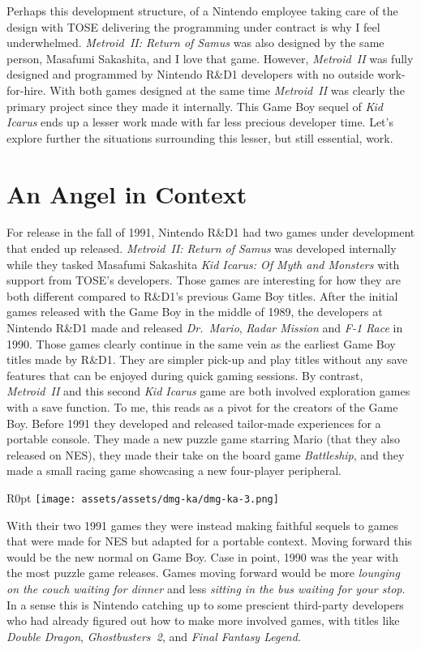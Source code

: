 \documentclass{book}
\begin{document}
Perhaps this development structure, of a Nintendo employee taking care of the design with TOSE delivering the programming under contract is why I feel underwhelmed. \emph{Metroid II: Return of Samus} was also designed by the same person, Masafumi Sakashita, and I love that game. However, \emph{Metroid II} was fully designed and programmed by Nintendo R\&D1 developers with no outside work-for-hire. With both games designed at the same time \emph{Metroid II} was clearly the primary project since they made it internally. This Game Boy sequel of \emph{Kid Icarus} ends up a lesser work made with far less precious developer time. Let’s explore further the situations surrounding this lesser, but still essential, work.

\FloatBarrier\needspace{10mm}\section*{An Angel in Context}\nopagebreak[4]

For release in the fall of 1991, Nintendo R\&D1 had two games under development that ended up released. \emph{Metroid II: Return of Samus} was developed internally while they tasked Masafumi Sakashita \emph{Kid Icarus: Of Myth and Monsters} with support from TOSE’s developers. Those games are interesting for how they are both different compared to R\&D1’s previous Game Boy titles. After the initial games released with the Game Boy in the middle of 1989, the developers at Nintendo R\&D1 made and released \emph{Dr. Mario}, \emph{Radar Mission} and \emph{F-1 Race} in 1990. Those games clearly continue in the same vein as the earliest Game Boy titles made by R\&D1. They are simpler pick-up and play titles without any save features that can be enjoyed during quick gaming sessions. By contrast, \emph{Metroid II} and this second \emph{Kid Icarus} game are both involved exploration games with a save function. To me, this reads as a pivot for the creators of the Game Boy. Before 1991 they developed and released tailor-made experiences for a portable console. They made a new puzzle game starring Mario (that they also released on NES), they made their take on the board game \emph{Battleship}, and they made a small racing game showcasing a new four-player peripheral.

\begin{wrapfigure}{R}{0pt} \texttt{[image: assets/assets/dmg-ka/dmg-ka-3.png]}\end{wrapfigure}
With their two 1991 games they were instead making faithful sequels to games that were made for NES but adapted for a portable context. Moving forward this would be the new normal on Game Boy. Case in point, 1990 was the year with the most puzzle game releases. Games moving forward would be more \emph{lounging on the couch waiting for dinner} and less \emph{sitting in the bus waiting for your stop}. In a sense this is Nintendo catching up to some prescient third-party developers who had already figured out how to make more involved games, with titles like \emph{Double Dragon}, \emph{Ghostbusters 2}, and \emph{Final Fantasy Legend}.
\end{document}
